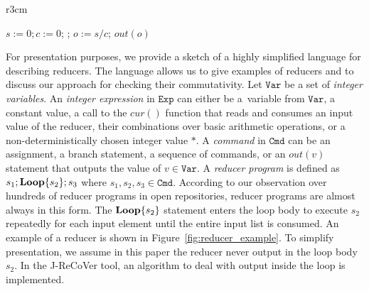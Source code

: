 \documentclass{llncs}
\newcommand{\Var}{\mathtt{Var}}
\newcommand{\Exp}{\mathtt{Exp}}
\newcommand{\Cmd}{\mathtt{Cmd}}
\newcommand{\cur}{cur()}
\newcommand{\rloop}{
	\ifmmode
	\mathbf{Loop}
	\else
	\textbf{Loop}
	\fi}
\begin{document}
\begin{wrapfigure}{r}{3cm}
		\vspace{-0.8cm}

	
	\begin{minipage}{0.3\textwidth}
		\begin{algorithm}[H]
			$s := 0;c:=0$; \;
			\Loop{}{
				$s := s+\cur$;\;
				$c := c+1$
			};
			$o := s/c$;\;
			$out(o)$\;
		\end{algorithm}
	\end{minipage}


	\caption{A reducer that computes the average value.}
	\vspace{-0.8cm}
	\label{fig:reducer_example}
\end{wrapfigure}

For presentation purposes, we provide a sketch of a highly simplified language
for describing reducers. The language allows us to give examples of reducers and
to discuss our approach for checking their commutativity. Let $\Var$ be a set of
\emph{integer variables}. An \emph{integer expression} in $\Exp$ can either be
a~variable from $\Var$, a constant value, a call to the $\cur$ function that
reads and consumes an input value of the reducer, their combinations over basic
arithmetic operations, or a non-deterministically chosen integer value $*$. A
\emph{command} in $\Cmd$ can be an assignment, a branch statement, a sequence of
commands, or an $out(v)$ statement that outputs the value of $v \in \Var$. A
\emph{reducer program} is defined as $s_1;\rloop\{s_2\};s_3$ where $s_1,s_2,s_3
\in \Cmd$. According to our observation over hundreds  of reducer programs in
open repositories, reducer programs are almost always in this form. The
$\rloop\{s_2\}$ statement enters the loop body to execute $s_2$ repeatedly for each input element until
the entire input list is consumed. An example of a reducer is shown in Figure~\ref{fig:reducer_example}. To simplify presentation, we assume in this paper the reducer never output in the loop body $s_2$. In the J-ReCoVer tool, an algorithm to deal with output inside the loop is implemented. 
\end{document}

